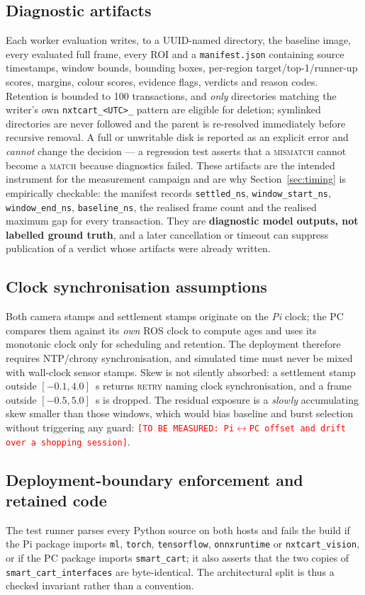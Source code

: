 \documentclass[conference]{IEEEtran}
\newcommand{\tbm}[1]{\textcolor{red}{\texttt{[TO BE MEASURED: #1]}}}
\begin{document}
\subsection{Diagnostic artifacts}
Each worker evaluation writes, to a UUID-named directory, the baseline image, every evaluated full
frame, every ROI and a \texttt{manifest.json} containing source timestamps, window bounds, bounding
boxes, per-region target/top-1/runner-up scores, margins, colour scores, evidence flags, verdicts and
reason codes. Retention is bounded to 100 transactions, and \emph{only} directories matching the
writer's own \texttt{nxtcart\_<UTC>\_<32-hex>} pattern are eligible for deletion; symlinked
directories are never followed and the parent is re-resolved immediately before recursive removal. A
full or unwritable disk is reported as an explicit error and \emph{cannot} change the decision --- a
regression test asserts that a \textsc{mismatch} cannot become a \textsc{match} because diagnostics
failed. These artifacts are the intended instrument for the measurement campaign and are why
Section~\ref{sec:timing} is empirically checkable: the manifest records \texttt{settled\_ns},
\texttt{window\_start\_ns}, \texttt{window\_end\_ns}, \texttt{baseline\_ns}, the realised frame count
and the realised maximum gap for every transaction. They are \textbf{diagnostic model outputs, not
labelled ground truth}, and a later cancellation or timeout can suppress publication of a verdict
whose artifacts were already written.

\subsection{Clock synchronisation assumptions}
Both camera stamps and settlement stamps originate on the \emph{Pi} clock; the PC compares them
against its \emph{own} ROS clock to compute ages and uses its monotonic clock only for scheduling and
retention. The deployment therefore requires NTP/chrony synchronisation, and simulated time must never
be mixed with wall-clock sensor stamps. Skew is not silently absorbed: a settlement stamp outside
$[-0.1,4.0]$~s returns \textsc{retry} naming clock synchronisation, and a frame outside
$[-0.5,5.0]$~s is dropped. The residual exposure is a \emph{slowly} accumulating skew smaller than
those windows, which would bias baseline and burst selection without triggering any guard:
\tbm{Pi$\leftrightarrow$PC offset and drift over a shopping session}.

\subsection{Deployment-boundary enforcement and retained code}
The test runner parses every Python source on both hosts and fails the build if the Pi package imports
\texttt{ml}, \texttt{torch}, \texttt{tensorflow}, \texttt{onnxruntime} or \texttt{nxtcart\_vision}, or
if the PC package imports \texttt{smart\_cart}; it also asserts that the two copies of
\texttt{smart\_cart\_interfaces} are byte-identical. The architectural split is thus a checked
invariant rather than a convention.
\end{document}
